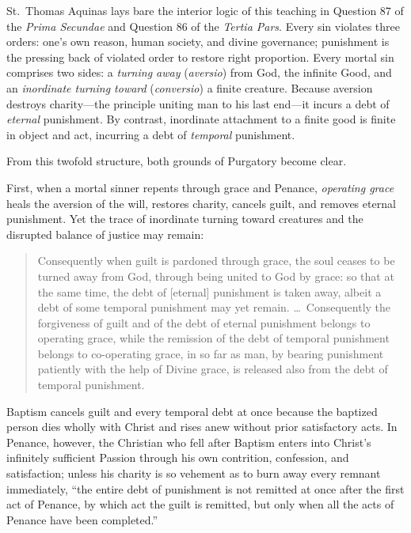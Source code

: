 St.\ Thomas Aquinas lays bare the interior logic of this teaching in Question 87 of the \textit{Prima Secundae} and Question 86 of the \textit{Tertia Pars}. Every sin violates three orders: one's own reason, human society, and divine governance; punishment is the pressing back of violated order to restore right proportion. Every mortal sin comprises two sides: a \textit{turning away} (\textit{aversio}) from God, the infinite Good, and an \textit{inordinate turning toward} (\textit{conversio}) a finite creature. Because aversion destroys charity---the principle uniting man to his last end---it incurs a debt of \textit{eternal} punishment. By contrast, inordinate attachment to a finite good is finite in object and act, incurring a debt of \textit{temporal} punishment.

From this twofold structure, both grounds of Purgatory become clear.

First, when a mortal sinner repents through grace and Penance, \textit{operating grace} heals the aversion of the will, restores charity, cancels guilt, and removes eternal punishment. Yet the trace of inordinate turning toward creatures and the disrupted balance of justice may remain:

\begin{quote}
Consequently when guilt is pardoned through grace, the soul ceases to be turned away from God, through being united to God by grace: so that at the same time, the debt of [eternal] punishment is taken away, albeit a debt of some temporal punishment may yet remain. \dots\ Consequently the forgiveness of guilt and of the debt of eternal punishment belongs to operating grace, while the remission of the debt of temporal punishment belongs to co-operating grace, in so far as man, by bearing punishment patiently with the help of Divine grace, is released also from the debt of temporal punishment.
\end{quote}

Baptism cancels guilt and every temporal debt at once because the baptized person dies wholly with Christ and rises anew without prior satisfactory acts. In Penance, however, the Christian who fell after Baptism enters into Christ's infinitely sufficient Passion through his own contrition, confession, and satisfaction; unless his charity is so vehement as to burn away every remnant immediately, ``the entire debt of punishment is not remitted at once after the first act of Penance, by which act the guilt is remitted, but only when all the acts of Penance have been completed.''

